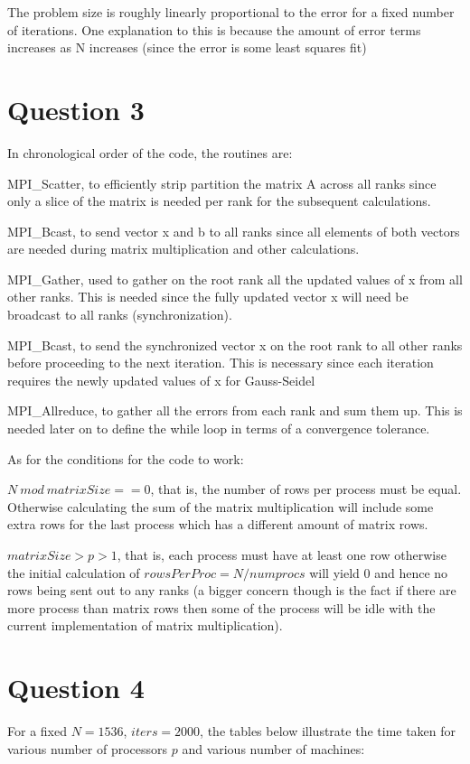 \documentclass[11pt, a4paper, parskip=full]{article}
\begin{document}
		The problem size is roughly linearly proportional to the error for a fixed number of iterations. One explanation to this is because the amount of error terms increases as N increases (since the error is some least squares fit)
	
	
	\section*{Question 3}
		In chronological order of the code, the routines are:

		MPI\_Scatter, to efficiently strip partition the matrix A across all ranks since only a slice of the matrix is needed per rank for the subsequent calculations.

		MPI\_Bcast, to send vector x and b to all ranks since all elements of both vectors are needed during matrix multiplication and other calculations.

		MPI\_Gather, used to gather on the root rank all the updated values of x from all other ranks. This is needed since the fully updated vector x will need be broadcast to all ranks (synchronization).

		MPI\_Bcast, to send the synchronized vector x on the root rank to all other ranks before proceeding to the next iteration. This is necessary since each iteration requires the newly updated values of x for Gauss-Seidel
		
		MPI\_Allreduce, to gather all the errors from each rank and sum them up. This is needed later on to define the while loop in terms of a convergence tolerance.
		
		As for the conditions for the code to work:

		$N\ mod\ matrixSize == 0$, that is, the number of rows per process must be equal. Otherwise calculating the sum of the matrix multiplication will include some extra rows for the last process which has a different amount of matrix rows.

		$matrixSize > p > 1$, that is, each process must have at least one row otherwise the initial calculation of $rowsPerProc = N / numprocs$ will yield $0$ and hence no rows being sent out to any ranks (a bigger concern though is the fact if there
are more process than matrix rows then some of the process will be idle with the current implementation of matrix multiplication).

	\newpage
	\section*{Question 4}
	For a fixed $N=1536$, $iters=2000$, the tables below illustrate the time taken for various number of processors $p$ and various number of machines:
\end{document}
